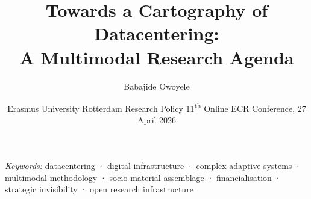 \documentclass[a4paper,justified,notoc]{tufte-handout}
\title{\texorpdfstring{Towards a Cartography of Datacentering:\\[0.3em]A Multimodal Research Agenda}{Towards a Cartography of Datacentering: A Multimodal Research Agenda}}
\author{Babajide Owoyele}
\date{Erasmus University Rotterdam\newline
      \small Research Policy 11\textsuperscript{th} Online ECR Conference, 27 April 2026}
\begin{document}
\maketitle
\renewcommand{\plaintitle}{Towards a Cartography of Datacentering: A Multimodal Research Agenda}

\begin{abstract}

\end{abstract}

\noindent\smallskip\textit{Keywords:} datacentering · digital infrastructure · complex adaptive systems · multimodal methodology · socio-material assemblage · financialisation · strategic invisibility · open research infrastructure

\bigskip











\appendix

\end{document}
